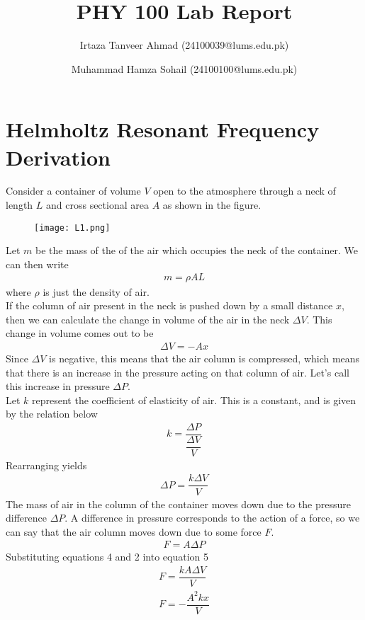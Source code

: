 \documentclass[10pt, a4paper]{article}
\title{PHY 100 Lab Report}
\author{Irtaza Tanveer Ahmad (24100039@lums.edu.pk) 
\and Muhammad Hamza Sohail (24100100@lums.edu.pk)}
\date{}
\begin{document}
\maketitle

\section*{Helmholtz Resonant Frequency Derivation}
Consider a container of volume $V$ open to the atmosphere through a neck of length $L$ and cross sectional area $A$ as shown in the figure.
\begin{figure}[H]
    \centering
    \texttt{[image: L1.png]}
    \label{fig:my_label}
\end{figure}
Let $m$ be the mass of the of the air which occupies the neck of the container. We can then write 
\begin{align}
    m = \rho AL
\end{align}
where $\rho$ is just the density of air. \\
If the column of air present in the neck is pushed down by a small distance $x$, then we can calculate the change in volume of the air in the neck $\Delta V$. This change in volume comes out to be 
\begin{align}
   \Delta V = -Ax
\end{align}
Since $\Delta V$ is negative, this means that the air column is compressed, which means that there is an increase in the pressure acting on that column of air. Let's call this increase in pressure $\Delta P$. \\
Let $k$ represent the coefficient of elasticity of air. This is a constant, and is given by the relation below
\begin{align}
    k = \dfrac{\Delta P}{\dfrac{\Delta V}{V}}
\end{align}
Rearranging yields 
\begin{align}
    \Delta P = \dfrac{k \Delta V}{V}
\end{align}
The mass of air in the column of the container moves down due to the pressure difference $\Delta P$. A difference in pressure corresponds to the action of a force, so we can say that the air column moves down due to some force $F$. 
\begin{align}
    F = A \Delta P
\end{align}
Substituting equations 4 and 2 into equation 5
\begin{align}
        F = \dfrac{k A \Delta V}{V} \\
        F = -\dfrac{A^2 k x}{V}
\end{align}
\end{document}
